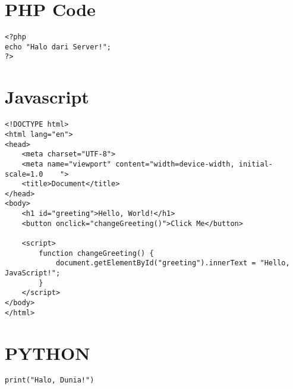 \section{PHP Code}
\begin{minipage}{0.99\linewidth}
    \begin{lstlisting}[style=PHPStyle,caption={Endpoint PHP Minimalis},label={lst:php-simple}]
<?php
echo "Halo dari Server!";
?>
\end{lstlisting}
\end{minipage}


\section{Javascript}
\begin{minipage}{0.99\linewidth}
    \begin{lstlisting}[style=JavaScriptStyle,caption={Javascript Minimalis},label={lst:js-simple}]
<!DOCTYPE html>
<html lang="en">
<head>
    <meta charset="UTF-8">
    <meta name="viewport" content="width=device-width, initial-scale=1.0    ">
    <title>Document</title>
</head>
<body>
    <h1 id="greeting">Hello, World!</h1>
    <button onclick="changeGreeting()">Click Me</button>

    <script>
        function changeGreeting() {
            document.getElementById("greeting").innerText = "Hello, JavaScript!";
        }
    </script>
</body>
</html>
\end{lstlisting}
\end{minipage}

\section{PYTHON}
\begin{minipage}{0.99\linewidth}
    \begin{lstlisting}[style=PythonStyle,caption={Python Minimalis},label={lst:python-simple}]
        print("Halo, Dunia!")
    \end{lstlisting}
\end{minipage}
